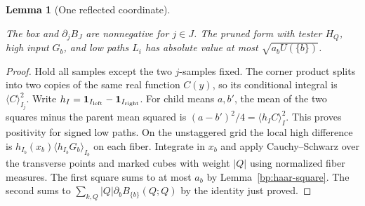 \documentclass[11pt,letterpaper]{article}
\newtheorem{lemma}[theorem]{Lemma}
\theoremstyle{definition}
\newcommand{\ind}{\mathbf1}
\newcommand{\avg}[2]{\langle #1\rangle_{#2}}
\providecommand{\lean}[1]{}
\providecommand{\uses}[1]{}
\begin{document}
\begin{lemma}[One reflected coordinate]\label{bp:box-square}
\lean{TwistedParaproduct.boxSquare}
The box and \(\partial_jB_J\) are nonnegative for \(j\in J\).
The pruned form with tester \(H_Q\), high input \(G_b\), and low
paths \(L_i\) has absolute value at most \(\sqrt{a_bU(\{b\})}\).
\end{lemma}
\begin{proof}
\uses{bp:haar-square,bp:energy-def,bp:marginal}
Hold all samples except the two \(j\)-samples fixed. The corner product
splits into two copies of the same real function \(C(y)\), so its
conditional integral is \(\avg C{I_j}^2\). Write
\(h_I=\ind_{I_{\rm left}}-\ind_{I_{\rm right}}\). For child means
\(a,b'\), the mean of the two squares minus the parent mean squared
is \((a-b')^2/4=\avg{h_IC}{I}^2\). This proves positivity for signed
low paths. On the unstaggered grid the local high difference is
\(h_{I_b}(x_b)\avg{h_{I_b}G_b}{I_b}\) on each fiber.
Integrate in \(x_b\) and apply Cauchy--Schwarz over the transverse
points and marked cubes with weight \(|Q|\) using normalized fiber
measures. The first square sums to at most \(a_b\) by
Lemma~\ref{bp:haar-square}. The second sums to
\(\sum_{k,Q}|Q|\partial_bB_{\{b\}}(Q;Q)\) by the identity just proved.
\end{proof}
\end{document}

